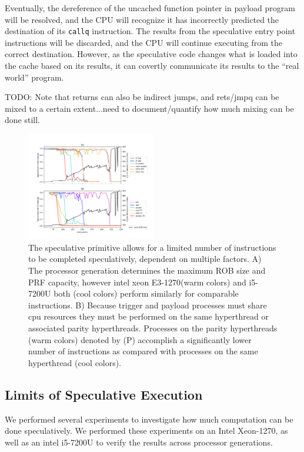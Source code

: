 Eventually, the dereference of the uncached function pointer in payload program
will be resolved, and the CPU will recognize it has incorrectly predicted the
destination of its \texttt{callq} instruction. The results from the speculative
entry point instructions will be discarded, and the CPU will continue executing
from the correct destination. However, as the speculative code changes what is
loaded into the cache based on its results, it can covertly communicate its
results to the ``real world'' program.


TODO: Note that returns can also be indirect jumps, and rets/jmpq can be mixed
to a certain extent...need to document/quantify how much mixing can be done
still.


\begin{figure}[t]
    \centering
        \includegraphics[width=0.5\textwidth]{figures/speculative_measurements.png}
    \caption{The speculative primitive allows for a limited number of instructions
        to be completed speculatively, dependent on multiple factors. A) The 
        processor generation determines the maximum ROB size and PRF capacity,
        however intel xeon E3-1270(warm colors) and i5-7200U both (cool colors) 
        perform similarly for comparable instructions. B) Because trigger and 
        payload processes must share cpu resources they must be performed on 
        the same hyperthread or associated parity hyperthreads. Processes on
        the parity hyperthreads (warm colors) denoted by (P) accomplish a 
        significantly lower number of instructions as compared with processes 
        on the same hyperthread (cool colors).}
    \label{fig:spec-capacity}
\end{figure}

\subsection{Limits of Speculative Execution}
We performed several experiments to investigate how much computation can be done
speculatively. We performed these experiments on an Intel Xeon-1270, as well as 
an intel i5-7200U to verify the results across processor generations. 

